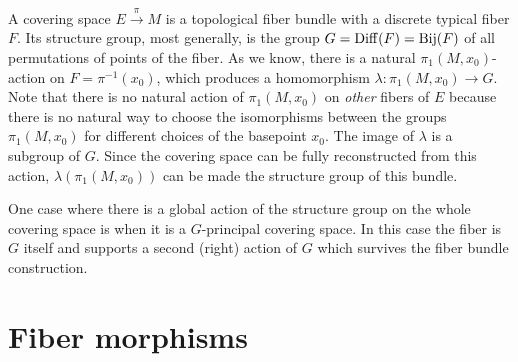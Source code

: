 \begin{example}
    A covering space $E\overset{\pi}{\to} M$ is a topological fiber bundle with a discrete typical fiber $F$. Its structure group, most generally, is the group $G=\operatorname{Diff}(F)=\mathrm{Bij}(F)$ of all permutations of points of the fiber. As we know, there is a natural $\pi_1(M,x_0)$-action on $F=\pi^{-1}(x_0)$, which produces a homomorphism $\lambda:\pi_1(M,x_0)\to G$. Note that there is no natural action of $\pi_1(M,x_0)$ on \emph{other} fibers of $E$ because there is no natural way to choose the isomorphisms between the groups $\pi_1(M,x_0)$ for different choices of the basepoint $x_0$. The image of $\lambda$ is a subgroup of $G$. Since the covering space can be fully reconstructed from this action, $\lambda(\pi_1(M,x_0))$ can be made the structure group of this bundle. 
    
    One case where there is a global action of the structure group on the whole covering space is when it is a $G$-principal covering space. In this case the fiber is $G$ itself and supports a second (right) action of $G$ which survives the fiber bundle construction.
\end{example}






\section{Fiber morphisms}\label{sec: fiber morphisms}

